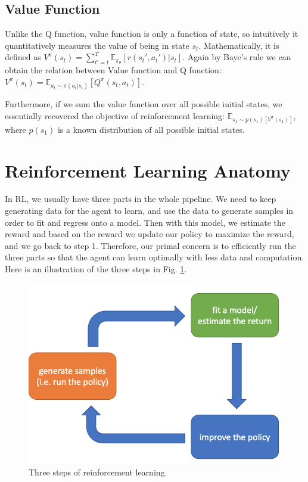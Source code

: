 \subsection{Value Function}
Unlike the Q function, value function is only a function of state, so intuitively it quantitatively measures the value of being in state $s_t$. Mathematically, it is defined as $V^\pi(s_t) =\sum_{t'=t}^T{\mathbb{E}_{\pi_\theta}[r(s_t',a_t')|s_t]}$. Again by Baye's rule we can obtain the relation between Value function and Q function: $V^\pi(s_t)=\mathbb{E}_{a_t\sim\pi(a_t|s_t)}[Q^\pi(s_t,a_t)]$.

Furthermore, if we sum the value function over all possible initial states, we essentially recovered the objective of reinforcement learning: $\mathbb{E}_{s_1\sim p(s_1)[V^\pi(s_1)]}$, where $p(s_1)$ is a known distribution of all possible initial states.
\section{Reinforcement Learning Anatomy}
In RL, we usually have three parts in the whole pipeline. We need to keep generating data for the agent to learn, and use the data to generate samples in order to fit and regress onto a model. Then with this model, we estimate the reward and based on the reward we update our policy to maximize the reward, and we go back to step 1. Therefore, our primal concern is to efficiently run the three parts so that the agent can learn optimally with less data and computation. Here is an illustration of the three steps in Fig. \ref{fig:rlanatomy}.
\begin{figure}
    \centering
    \includegraphics[scale=0.5]{figures/rlanatomy.png}
    \caption{Three steps of reinforcement learning.}
    \label{fig:rlanatomy}
\end{figure}